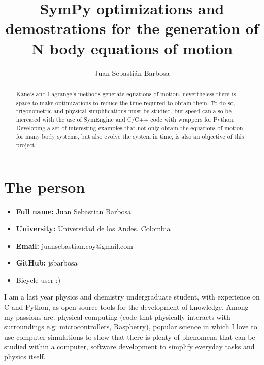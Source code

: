 \documentclass[12pt]{article}
\title{SymPy optimizations and demostrations for the generation of N body equations of motion}
\author{Juan Sebasti\'an Barbosa}
\begin{document}
\maketitle

\begin{abstract}
	Kane's and Lagrange's methods generate equations of motion, nevertheless there is space to make optimizations to reduce the time required to obtain them. To do so, trigonometric and physical simplifications must be studied, but speed can also be increased with the use of SymEngine and C/C++ code with wrappers for Python. Developing a set of interesting examples that not only obtain the equations of motion for many body systems, but also evolve the system in time, is also an objective of this project
\end{abstract}

\section{The person}
\begin{itemize}
	\item \textbf{Full name:} Juan Sebastian Barbosa
	\item \textbf{University:} Universidad de los Andes, Colombia
	\item \textbf{Email:} juansebastian.coy@gmail.com
	\item \textbf{GitHub:} jsbarbosa
	\item Bicycle user :)
\end{itemize}

I am a last year physics and chemistry undergraduate student, with experience on C and Python, as open-source tools for the development of knowledge. Among my passions are: physical computing (code that physically interacts with surroundings e.g: microcontrollers, Raspberry), popular science in which I love to use computer simulations to show that there is plenty of phenomena that can be studied within a computer, software development to simplify everyday tasks and physics itself.
\end{document}
